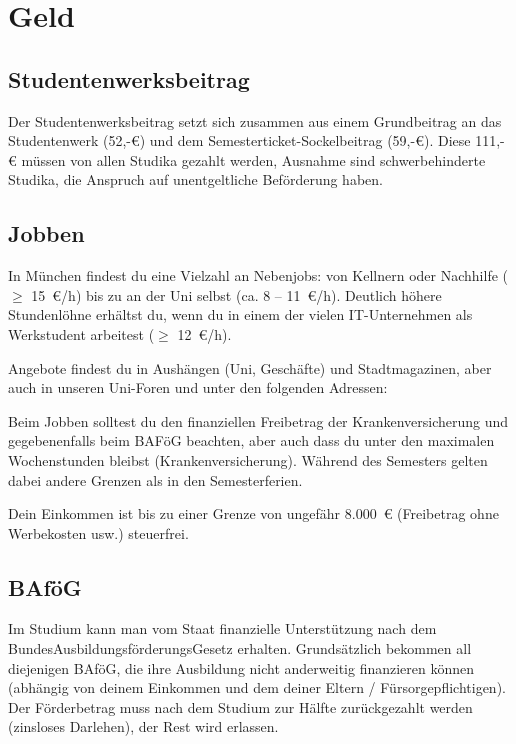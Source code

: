 ﻿
\chapter{Geld}

\section{Studentenwerksbeitrag}
Der Studentenwerksbeitrag setzt sich zusammen aus einem Grundbeitrag an das Studentenwerk (52,-€) und dem
Semesterticket-Sockelbeitrag (59,-€).
Diese 111,-€ müssen von allen Studika gezahlt werden, Ausnahme sind schwerbehinderte Studika, die Anspruch
auf unentgeltliche Beförderung haben.

\section{Jobben}
In München findest du eine Vielzahl an Nebenjobs: von Kellnern oder Nachhilfe ($\geq$ 15~€/h) bis zu an der Uni selbst (ca. 8 -- 11~€/h). Deutlich höhere Stundenlöhne erhältst du, wenn du in einem der vielen IT-Unternehmen als Werkstudent arbeitest ($\geq$ 12~€/h).

Angebote findest du in Aushängen (Uni, Geschäfte) und Stadtmagazinen, aber auch in unseren Uni-Foren und unter den folgenden Adressen:
\begin{urlList}
\end{urlList}

Beim Jobben solltest du den finanziellen Freibetrag der Krankenversicherung und gegebenenfalls beim BAFöG beachten, aber auch dass du unter den maximalen Wochenstunden bleibst (Krankenversicherung). Während des Semesters gelten dabei andere Grenzen als in den Semesterferien.

Dein Einkommen ist bis zu einer Grenze von ungefähr 8.000~€ (Freibetrag ohne Werbekosten usw.) steuerfrei.


\section{BAföG}
Im Studium kann man vom Staat finanzielle Unterstützung nach dem BundesAusbildungsförderungsGesetz erhalten. Grundsätzlich bekommen all diejenigen BAföG, die ihre Ausbildung nicht anderweitig finanzieren können (abhängig von deinem Einkommen und dem deiner Eltern / Fürsorgepflichtigen). Der Förderbetrag muss nach dem Studium zur Hälfte zurückgezahlt werden (zinsloses Darlehen), der Rest wird erlassen.

